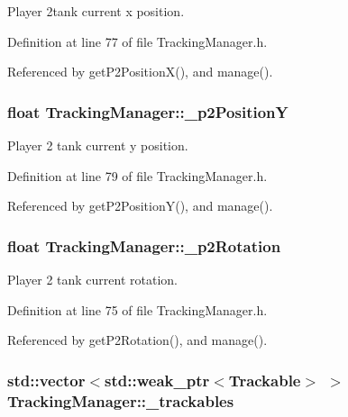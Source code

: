 Player 2tank current x position. 



Definition at line 77 of file Tracking\-Manager.\-h.



Referenced by get\-P2\-Position\-X(), and manage().

\hypertarget{classTrackingManager_ad4d803802447b6c8a1a09104263fd829}{
\subsubsection[{\-\_\-p2\-Position\-Y}]{\setlength{\rightskip}{0pt plus 5cm}float Tracking\-Manager\-::\-\_\-p2\-Position\-Y\hspace{0.3cm}{\ttfamily [private]}}}\label{classTrackingManager_ad4d803802447b6c8a1a09104263fd829}


Player 2 tank current y position. 



Definition at line 79 of file Tracking\-Manager.\-h.



Referenced by get\-P2\-Position\-Y(), and manage().

\hypertarget{classTrackingManager_a04442a7d5e399370637c9e334a257eb6}{
\subsubsection[{\-\_\-p2\-Rotation}]{\setlength{\rightskip}{0pt plus 5cm}float Tracking\-Manager\-::\-\_\-p2\-Rotation\hspace{0.3cm}{\ttfamily [private]}}}\label{classTrackingManager_a04442a7d5e399370637c9e334a257eb6}


Player 2 tank current rotation. 



Definition at line 75 of file Tracking\-Manager.\-h.



Referenced by get\-P2\-Rotation(), and manage().

\hypertarget{classTrackingManager_add21c42cf5a993fbf5a95abd7e36f3dc}{
\subsubsection[{\-\_\-trackables}]{\setlength{\rightskip}{0pt plus 5cm}std\-::vector$<$std\-::weak\-\_\-ptr$<${\bf Trackable}$>$ $>$ Tracking\-Manager\-::\-\_\-trackables\hspace{0.3cm}{\ttfamily [private]}}}\label{classTrackingManager_add21c42cf5a993fbf5a95abd7e36f3dc}


